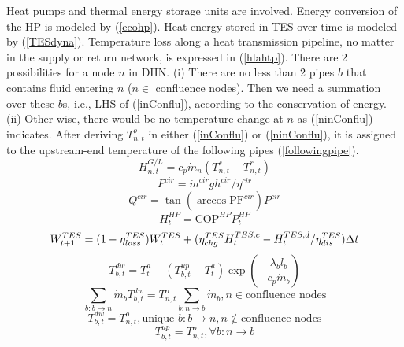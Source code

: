 \documentclass[journal,twoside,web]{ieeecolor}
\begin{document}
Heat pumps and thermal energy storage units \cite{dhnModel} are involved.
Energy conversion of the HP is modeled by (\ref{ecohp}).
Heat energy stored in TES over time is modeled by (\ref{TESdyna}).
Temperature loss along a heat transmission pipeline, no matter in the supply or return network, is expressed in (\ref{hlahtp}).
There are 2 possibilities for a node $n$ in DHN.
(i) There are no less than 2 pipes $b$ that contains fluid entering $n$ ($n \in$ confluence nodes). Then we need a summation over these $b$s, i.e., LHS of (\ref{inConflu}), according to the conservation of energy.
(ii) Other wise, there would be no temperature change at $n$ as (\ref{ninConflu}) indicates.
After deriving $T^o_{n,t}$ in either (\ref{inConflu}) or (\ref{ninConflu}), it is assigned to the upstream-end temperature of the following pipes (\ref{followingpipe}).
\begin{equation}\label{heatExg}
    H^{G/L}_{n,t} = c_p\dot m_n(T^s_{n,t}-T^r_{n,t})
\end{equation}
\begin{equation}\label{cP_act}
    P^{cir} = \dot m^{cir}gh^{cir}/\eta^{cir}
\end{equation}
\begin{equation}\label{cP_rea}
    Q^{cir} = \tan (\arccos \text{PF}^{cir}) P^{cir}
\end{equation}
\begin{equation}\label{ecohp}
    H^{HP}_t = \text{COP}^{HP} P^{HP}_t
\end{equation}
\begin{equation}\label{TESdyna}\footnotesize
    W^{TES}_{t+1}=(1-\eta^{TES}_{loss})W^{TES}_t+(\eta^{TES}_{chg}H^{TES,c}_t-H^{TES,d}_t/\eta^{TES}_{dis})\Delta t
\end{equation}
\begin{equation}\label{hlahtp}
    T^{dw}_{b,t}=T^a_t+(T^{up}_{b,t}-T^a_t)\exp(-\frac{\lambda_bl_b}{c_p\dot m_b})
\end{equation}
\begin{equation}\label{inConflu}
    \sum_{b:b\rightarrow n} \dot m_bT^{dw}_{b,t}  = T^o_{n,t} \sum_{b:n\rightarrow b} \dot m_b, n \in \text{confluence nodes}
\end{equation}
\begin{equation}\label{ninConflu}
    T^{dw}_{b,t} = T^o_{n,t},\text{unique } b:b\rightarrow n ,n \notin \text{confluence nodes}
\end{equation}
\begin{equation}\label{followingpipe}
    T^{up}_{b,t}=T^o_{n,t}, \forall b: n\rightarrow b
\end{equation}
\end{document}
